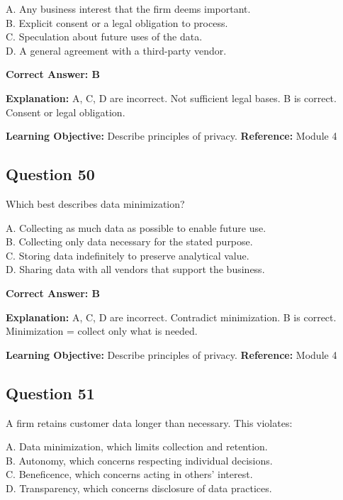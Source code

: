 \documentclass[11pt]{article}
\begin{document}
	A. Any business interest that the firm deems important.\\
	B. Explicit consent or a legal obligation to process.\\
	C. Speculation about future uses of the data.\\
	D. A general agreement with a third-party vendor.
	
	\vspace{0.4em}
	\textbf{Correct Answer: B}
	
	\textbf{Explanation:}
	A, C, D are incorrect. Not sufficient legal bases.
	B is correct. Consent or legal obligation.
	
	\textbf{Learning Objective:} Describe principles of privacy.
	\textbf{Reference:} Module 4
	
	\subsection*{Question 50}
	Which best describes data minimization?
	
	A. Collecting as much data as possible to enable future use.\\
	B. Collecting only data necessary for the stated purpose.\\
	C. Storing data indefinitely to preserve analytical value.\\
	D. Sharing data with all vendors that support the business.
	
	\vspace{0.4em}
	\textbf{Correct Answer: B}
	
	\textbf{Explanation:}
	A, C, D are incorrect. Contradict minimization.
	B is correct. Minimization = collect only what is needed.
	
	\textbf{Learning Objective:} Describe principles of privacy.
	\textbf{Reference:} Module 4
	
	\subsection*{Question 51}
	A firm retains customer data longer than necessary. This violates:
	
	A. Data minimization, which limits collection and retention.\\
	B. Autonomy, which concerns respecting individual decisions.\\
	C. Beneficence, which concerns acting in others' interest.\\
	D. Transparency, which concerns disclosure of data practices.
	
\end{document}
